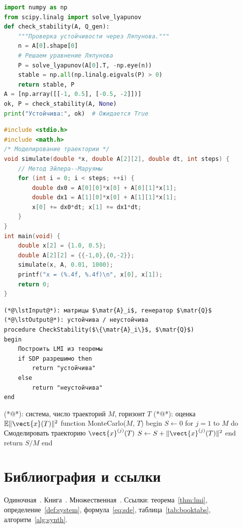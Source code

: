 \documentclass[font=modern]{cmcmsuthesis-doctoral}
\begin{document}
\begin{lstlisting}[language=Python,caption={Python},label={lst:py}]
import numpy as np
from scipy.linalg import solve_lyapunov
def check_stability(A, Q_gen):
    """Проверка устойчивости через Ляпунова."""
    n = A[0].shape[0]
    # Решаем уравнение Ляпунова
    P = solve_lyapunov(A[0].T, -np.eye(n))
    stable = np.all(np.linalg.eigvals(P) > 0)
    return stable, P
A = [np.array([[-1, 0.5], [-0.5, -2]])]
ok, P = check_stability(A, None)
print("Устойчива:", ok)  # Ожидается True
\end{lstlisting}

\begin{lstlisting}[language=C,caption={C},label={lst:c}]
#include <stdio.h>
#include <math.h>
/* Моделирование траектории */
void simulate(double *x, double A[2][2], double dt, int steps) {
    // Метод Эйлера--Маруямы
    for (int i = 0; i < steps; ++i) {
        double dx0 = A[0][0]*x[0] + A[0][1]*x[1];
        double dx1 = A[1][0]*x[0] + A[1][1]*x[1];
        x[0] += dx0*dt; x[1] += dx1*dt;
    }
}
int main(void) {
    double x[2] = {1.0, 0.5};
    double A[2][2] = {{-1,0},{0,-2}};
    simulate(x, A, 0.01, 1000);
    printf("x = (%.4f, %.4f)\n", x[0], x[1]);
    return 0;
}
\end{lstlisting}

\begin{lstlisting}[style=pseudocode,caption={Псевдокод}]
(*@\lstInput@*): матрицы $\matr{A}_i$, генератор $\matr{Q}$
(*@\lstOutput@*): устойчива / неустойчива
procedure CheckStability($\{\matr{A}_i\}$, $\matr{Q}$)
begin
    Построить LMI из теоремы
    if SDP разрешимо then
        return "устойчива"
    else
        return "неустойчива"
end
\end{lstlisting}

\begin{lstpseudocode}[caption={Монте-Карло},label={alg:mc}]
(*@\lstInput@*): система, число траекторий $M$, горизонт $T$
(*@\lstOutput@*): оценка $\mathbb{E}\|\vect{x}(T)\|^2$
function MonteCarlo($M$, $T$)
begin
    $S \gets 0$
    for $j = 1$ to $M$ do
        Смоделировать траекторию $\vect{x}^{(j)}(T)$
        $S \gets S + \|\vect{x}^{(j)}(T)\|^2$
    end
    return $S / M$
end
\end{lstpseudocode}

\chapter{Библиография и ссылки}
Одиночная~\cite{shannon1948}. Книга~\cite{knuth1984}.
Множественная~\cite{shannon1948,knuth1984,macwilliams1979}.
Ссылки: теорема~\ref{thm:lmi}, определение~\ref{def:system},
формула~\eqref{eq:sde}, таблица~\ref{tab:booktabs},
алгоритм~\ref{alg:synth}.
\end{document}
